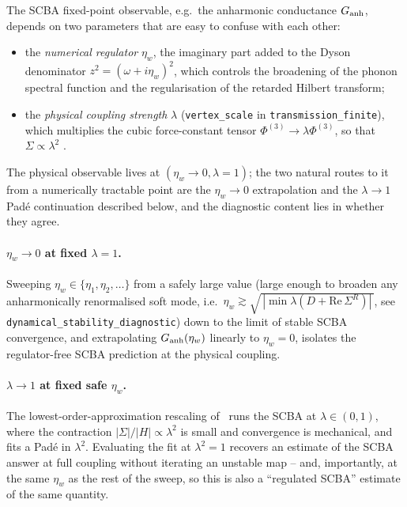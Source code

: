 The SCBA fixed-point observable, e.g.\ the anharmonic conductance
$G_{\rm anh}$, depends on two parameters that are easy to confuse with
each other:
\begin{itemize}
\item the \emph{numerical regulator} $\eta_{w}$, the imaginary part
added to the Dyson denominator
$z^{2}=(\omega+i\eta_{w})^{2}$, which controls the broadening of the
phonon spectral function and the regularisation of the retarded
Hilbert transform;
\item the \emph{physical coupling strength} $\lambda$ (\texttt{vertex\_scale}
in \texttt{transmission\_finite}), which multiplies the cubic
force-constant tensor $\Phi^{(3)}\to\lambda\Phi^{(3)}$, so that
$\Sigma\propto\lambda^{2}$
\cite{mera_inelastic_2012}.
\end{itemize}
The physical observable lives at $(\eta_{w}\!\to\!0,\lambda\!=\!1)$;
the two natural routes to it from a numerically tractable point are the
$\eta_{w}\!\to\!0$ extrapolation and the $\lambda\!\to\!1$ Pad\'e
continuation described below, and the diagnostic content lies in
whether they agree.

\paragraph{$\eta_{w}\!\to\!0$ at fixed $\lambda=1$.}
Sweeping $\eta_{w}\in\{\eta_{1},\eta_{2},\ldots\}$ from a safely large
value (large enough to broaden any anharmonically renormalised soft
mode, i.e.\ $\eta_{w}\!\gtrsim\!\sqrt{\,|\min\lambda(D+\mathrm{Re}\,\Sigma^{R})|\,}$\!\!,
see \texttt{dynamical\_stability\_diagnostic}) down to the
limit of stable SCBA convergence, and extrapolating
$G_{\rm anh}(\eta_{w})$ linearly to $\eta_{w}\!=\!0$, isolates the
regulator-free SCBA prediction at the physical coupling.

\paragraph{$\lambda\!\to\!1$ at fixed safe $\eta_{w}$.}
The lowest-order-approximation rescaling
of~\cite{mera_inelastic_2012} runs the SCBA at
$\lambda\in(0,1)$, where the contraction
$|\Sigma|/|H|\propto\lambda^{2}$ is small and convergence is
mechanical, and fits a Pad\'e in $\lambda^{2}$. Evaluating the fit at
$\lambda^{2}\!=\!1$ recovers an estimate of the SCBA answer at full
coupling without iterating an unstable map -- and, importantly, at
the same $\eta_{w}$ as the rest of the sweep, so this is also a
``regulated SCBA'' estimate of the same quantity.

